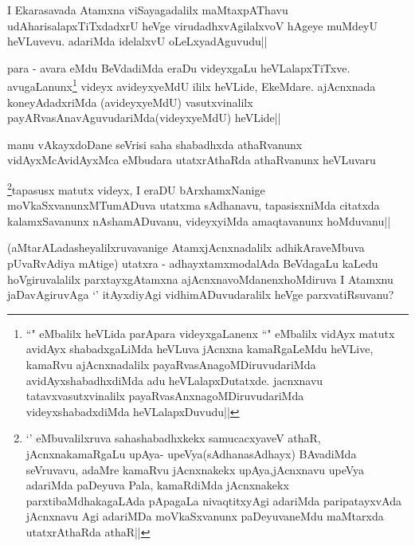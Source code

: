 \begin{artha}
I Ekarasavada Atamxna viSayagadalilx maMtaxpAThavu udAharisalapxTiTxdadxrU heVge virudadhxvAgilalxvoV hAgeye muMdeyU heVLuvevu. adariMda idelalxvU oLeLxyadAguvudu||
\end{artha}

\begin{artha}
para - avara eMdu BeVdadiMda eraDu videyxgaLu heVLalapxTiTxve. avugaLanunx\footnote{``\stext" eMbalilx heVLida parApara videyxgaLanenx ``\stext" eMbalilx vidAyx matutx avidAyx shabadxgaLiMda heVLuva jAcnxna kamaRgaLeMdu heVLive, kamaRvu ajAcnxnadalilx payaRvasAnagoMDiruvudariMda avidAyxshabadhxdiMda adu heVLalapxDutatxde. jacnxnavu tatavxvasutxvinalilx payaRvasAnxnagoMDiruvudariMda videyxshabadxdiMda heVLalapxDuvudu||} videyx avideyxyeMdU ililx heVLide, EkeMdare. ajAcnxnada koneyAdadxriMda (avideyxyeMdU) vasutxvinalilx payARvasAnavAguvudariMda(videyxyeMdU) heVLide||
\end{artha}


\begin{artha}
manu vAkayxdoDane seVrisi saha shabadhxda athaRvanunx vidAyxMcAvidAyxMca eMbudara utatxrAthaRda athaRvanunx heVLuvaru
\end{artha}



\begin{artha}
\footnote[2]{`\stext' eMbuvalilxruva sahashabadhxkekx samucacxyaveV athaR, jAcnxnakamaRgaLu upAya- upeVya(sAdhanasAdhayx) BAvadiMda seVruvavu, adaMre kamaRvu jAcnxnakekx upAya,jAcnxnavu upeVya adariMda paDeyuva Pala, kamaRdiMda jAcnxnakekx   parxtibaMdhakagaLAda pApagaLa nivaqtitxyAgi adariMda paripatayxvAda jAcnxnavu Agi adariMDa moVkaSxvanunx paDeyuvaneMdu maMtarxda utatxrAthaRda athaR||}tapasusx matutx videyx, I eraDU bArxhamxNanige moVkaSxvanunxMTumADuva utatxma sAdhanavu, tapasisxniMda citatxda kalamxSavanunx nAshamADuvanu, videyxyiMda amaqtavanunx hoMduvanu||
\end{artha}

\begin{artha}
(aMtarALadasheyalilxruvavanige AtamxjAcnxnadalilx adhikAraveMbuva pUvaRvAdiya mAtige) utatxra - adhayxtamxmodalAda BeVdagaLu kaLedu hoVgiruvalalilx parxtayxgAtamxna ajAcnxnavoMdanenxhoMdiruva I Atamxnu jaDavAgiruvAga `\stext' itAyxdiyAgi vidhimADuvudaralilx heVge parxvatiRsuvanu?
\end{artha}


